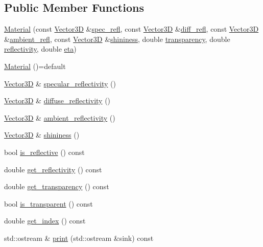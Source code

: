 \subsection*{Public Member Functions}
\begin{DoxyCompactItemize}
\item 
\mbox{\hyperlink{classMaterial_a4e63e7e70f9a2cc55801f798d88f5c14}{Material}} (const \mbox{\hyperlink{classVector3D}{Vector3D}} \&\mbox{\hyperlink{classMaterial_a8b1858703e3298ba1cc705684939f953}{spec\+\_\+refl}}, const \mbox{\hyperlink{classVector3D}{Vector3D}} \&\mbox{\hyperlink{classMaterial_af53038fbe5bbe5d1a9801aabc97543a5}{diff\+\_\+refl}}, const \mbox{\hyperlink{classVector3D}{Vector3D}} \&\mbox{\hyperlink{classMaterial_a40002cba7c7049feb2bddaf57ae96ba4}{ambient\+\_\+refl}}, const \mbox{\hyperlink{classVector3D}{Vector3D}} \&\mbox{\hyperlink{classMaterial_abd4573ad64b9e4ebc7d3a365e2078d69}{shininess}}, double \mbox{\hyperlink{classMaterial_a02abe03436775e128e04e1c737d34067}{transparency}}, double \mbox{\hyperlink{classMaterial_a050f60e6002271e571c4e5afc4b097b5}{reflectivity}}, double \mbox{\hyperlink{classMaterial_a62e8368c76c975790315b16d97558c26}{eta}})
\item 
\mbox{\hyperlink{classMaterial_a6059ec72855855b11672ff25962e9336}{Material}} ()=default
\item 
\mbox{\hyperlink{classVector3D}{Vector3D}} \& \mbox{\hyperlink{classMaterial_a927c720ad76f97c4619dca4a1b609b26}{specular\+\_\+reflectivity}} ()
\item 
\mbox{\hyperlink{classVector3D}{Vector3D}} \& \mbox{\hyperlink{classMaterial_a3f4ff9c259e67dcffa2d607f788fd2a1}{diffuse\+\_\+reflectivity}} ()
\item 
\mbox{\hyperlink{classVector3D}{Vector3D}} \& \mbox{\hyperlink{classMaterial_a2b80ada55bf639ce99daa45f8c94bfc6}{ambient\+\_\+reflectivity}} ()
\item 
\mbox{\hyperlink{classVector3D}{Vector3D}} \& \mbox{\hyperlink{classMaterial_abd4573ad64b9e4ebc7d3a365e2078d69}{shininess}} ()
\item 
bool \mbox{\hyperlink{classMaterial_a2acf2b5d1f12b1a8d307e6d22269b795}{is\+\_\+reflective}} () const
\item 
double \mbox{\hyperlink{classMaterial_aed193fc3ec1afe1b7464211bf7f2bf6c}{get\+\_\+reflectivity}} () const
\item 
double \mbox{\hyperlink{classMaterial_a1b5862b5e73cce657acdba131e9b27e0}{get\+\_\+transparency}} () const
\item 
bool \mbox{\hyperlink{classMaterial_affa2e5ddf19bbfef02cb7dedf0e92e1f}{is\+\_\+transparent}} () const
\item 
double \mbox{\hyperlink{classMaterial_a06ebb56a3d99fc1f989910b368248094}{get\+\_\+index}} () const
\item 
std\+::ostream \& \mbox{\hyperlink{classMaterial_a31974b6cb26ecfe1389ab701495b28ea}{print}} (std\+::ostream \&sink) const
\end{DoxyCompactItemize}
